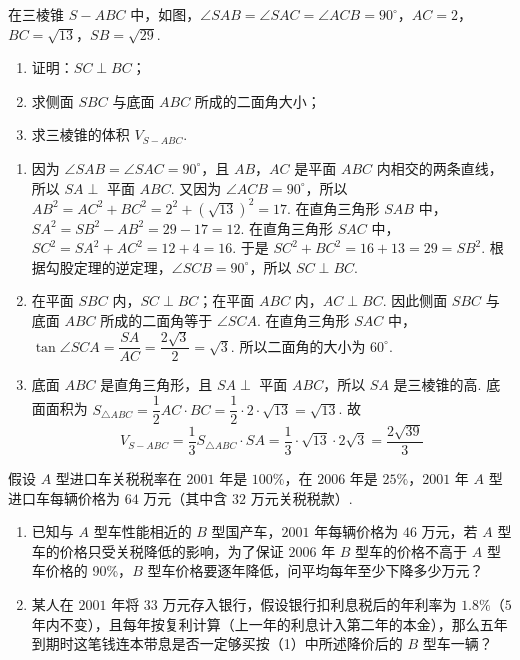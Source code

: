 \begin{problem}
在三棱锥 \(S-ABC\) 中，如图，\(\angle SAB=\angle SAC=\angle ACB=90^{\circ}\)，\(AC=2\)，\(BC=\sqrt{13}\)，\(SB=\sqrt{29}\).

\begin{enumerate}
\item 证明：\(SC\perp BC\)；
\item 求侧面 \(SBC\) 与底面 \(ABC\) 所成的二面角大小；
\item 求三棱锥的体积 \(V_{S-ABC}\).
\end{enumerate}

\end{problem}

\begin{solution}
\begin{enumerate}
\item 因为 \(\angle SAB=\angle SAC=90^{\circ}\)，且 \(AB\)，\(AC\) 是平面 \(ABC\) 内相交的两条直线，所以 \(SA\perp\) 平面 \(ABC\). 又因为 \(\angle ACB=90^{\circ}\)，所以
 \(AB^{2}=AC^{2}+BC^{2}=2^{2}+\left(\sqrt{13}\right)^{2}=17\). 在直角三角形 \(SAB\) 中，\(SA^{2}=SB^{2}-AB^{2}=29-17=12\). 在直角三角形 \(SAC\) 中，\(SC^{2}=SA^{2}+AC^{2}=12+4=16\).
于是 \(SC^{2}+BC^{2}=16+13=29=SB^{2}\). 根据勾股定理的逆定理，\(\angle SCB=90^{\circ}\)，所以 \(SC\perp BC\).

 \item 在平面 \(SBC\) 内，\(SC\perp BC\)；在平面 \(ABC\) 内，\(AC\perp BC\). 因此侧面 \(SBC\) 与底面 \(ABC\) 所成的二面角等于 \(\angle SCA\). 在直角三角形 \(SAC\) 中，\(\tan\angle SCA=\dfrac{SA}{AC}=\dfrac{2\sqrt{3}}{2}=\sqrt{3}\).
所以二面角的大小为 \(60^{\circ}\).

 \item 底面 \(ABC\) 是直角三角形，且 \(SA\perp\) 平面 \(ABC\)，所以 \(SA\) 是三棱锥的高. 底面面积为 \(S_{\triangle ABC}=\dfrac{1}{2}AC\cdot BC=\dfrac{1}{2}\cdot2\cdot\sqrt{13}=\sqrt{13}\).
故
\[
V_{S-ABC}=\dfrac{1}{3}S_{\triangle ABC}\cdot SA=\dfrac{1}{3}\cdot\sqrt{13}\cdot2\sqrt{3}=\dfrac{2\sqrt{39}}{3}
\]
\end{enumerate}
\end{solution}

\begin{problem}
假设 \(A\) 型进口车关税税率在 \(2001\) 年是 \(100\%\)，在 \(2006\) 年是 \(25\%\)，\(2001\) 年 \(A\) 型进口车每辆价格为 \(64\text{ 万元}\)（其中含 \(32\text{ 万元}\)关税税款）.

\begin{enumerate}
\item 已知与 \(A\) 型车性能相近的 \(B\) 型国产车，\(2001\) 年每辆价格为 \(46\text{ 万元}\)，若 \(A\) 型车的价格只受关税降低的影响，为了保证 \(2006\) 年 \(B\) 型车的价格不高于 \(A\) 型车价格的 90\%，\(B\) 型车价格要逐年降低，问平均每年至少下降多少万元？
\item 某人在 \(2001\) 年将 \(33\text{ 万元}\)存入银行，假设银行扣利息税后的年利率为 \(1.8\%\)（\(5\) 年内不变），且每年按复利计算（上一年的利息计入第二年的本金），那么五年到期时这笔钱连本带息是否一定够买按（1）中所述降价后的 \(B\) 型车一辆？
\end{enumerate}
\end{problem}

